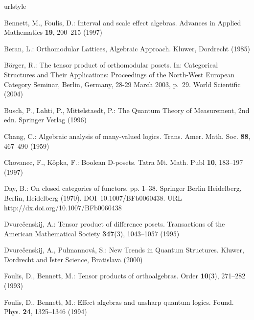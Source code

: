\documentclass[smallextended]{svjour3}
\begin{document}
\begin{thebibliography}{10}
\providecommand{\url}[1]{{#1}}
\providecommand{\urlprefix}{URL }
\expandafter\ifx\csname urlstyle\endcsname\relax
  \providecommand{\doi}[1]{DOI~\discretionary{}{}{}#1}\else
  \providecommand{\doi}{DOI~\discretionary{}{}{}\begingroup
  \urlstyle{rm}\Url}\fi

Bennett, M., Foulis, D.: Interval and scale effect algebras.
\newblock Advances in Applied Mathematics \textbf{19}, 200--215 (1997)

Beran, L.: Orthomodular Lattices, Algebraic Approach.
\newblock Kluwer, Dordrecht (1985)

B{\"{o}}rger, R.: The tensor product of orthomodular posets.
\newblock In: Categorical Structures and Their Applications: Proceedings of the
  North-West European Category Seminar, Berlin, Germany, 28-29 March 2003,
  p.~29. World Scientific (2004)

Busch, P., Lahti, P., Mittelstaedt, P.: The Quantum Theory of Measurement, 2nd
  edn.
\newblock Springer Verlag (1996)

Chang, C.: Algebraic analysis of many-valued logics.
\newblock Trans. Amer. Math. Soc. \textbf{88}, 467--490 (1959)

Chovanec, F., K{\^o}pka, F.: {B}oolean {D}-posets.
\newblock Tatra Mt. Math. Publ \textbf{10}, 183--197 (1997)

Day, B.: On closed categories of functors, pp. 1--38.
\newblock Springer Berlin Heidelberg, Berlin, Heidelberg (1970).
\newblock \doi{10.1007/BFb0060438}.
\newblock \urlprefix\url{http://dx.doi.org/10.1007/BFb0060438}

Dvure{\v{c}}enskij, A.: Tensor product of difference posets.
\newblock Transactions of the American Mathematical Society \textbf{347}(3),
  1043--1057 (1995)

Dvure{\v c}enskij, A., Pulmannov{\'a}, S.: New Trends in Quantum Structures.
\newblock Kluwer, Dordrecht and Ister Science, Bratislava (2000)

Foulis, D., Bennett, M.: Tensor products of orthoalgebras.
\newblock Order \textbf{10}(3), 271--282 (1993)

Foulis, D., Bennett, M.: Effect algebras and unsharp quantum logics.
\newblock Found. Phys. \textbf{24}, 1325--1346 (1994)


\end{thebibliography}
\end{document}
